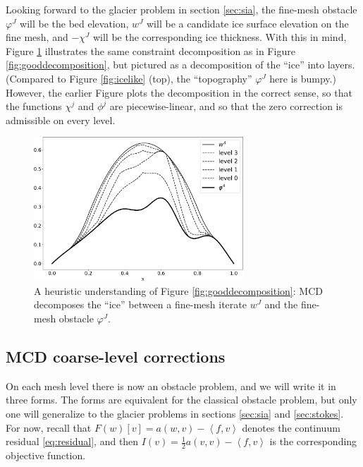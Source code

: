 \documentclass[letterpaper,final,12pt,reqno]{amsart}
\theoremstyle{claim}
\newcommand{\ip}[2]{\left<#1,#2\right>}
\numberwithin{equation}{section}
\numberwithin{figure}{section}
\numberwithin{table}{section}
\numberwithin{theorem}{section}
\begin{document}
Looking forward to the glacier problem in section \ref{sec:sia}, the fine-mesh obstacle $\varphi^J$ will be the bed elevation, $w^J$ will be a candidate ice surface elevation on the fine mesh, and $-\chi^J$ will be the corresponding ice thickness.  With this in mind, Figure \ref{fig:icelikedecomposition} illustrates the same constraint decomposition as in Figure \ref{fig:gooddecomposition}, but pictured as a decomposition of the ``ice'' into layers.  (Compared to Figure \ref{fig:icelike} (top), the ``topography'' $\varphi^J$ here is bumpy.)  However, the earlier Figure plots the decomposition in the correct sense, so that the functions $\chi^j$ and $\phi^j$ are piecewise-linear, and so that the zero correction is admissible on every level.

\begin{figure}
\includegraphics[width=0.7\textwidth]{fixfigs/icedec_defect.pdf}
\caption{A heuristic understanding of Figure \ref{fig:gooddecomposition}: MCD decomposes the ``ice'' between a fine-mesh iterate $w^J$ and the fine-mesh obstacle $\varphi^J$.}
\label{fig:icelikedecomposition}
\end{figure}

\subsection*{MCD coarse-level corrections}  On each mesh level there is now an obstacle problem, and we will write it in three forms.  The forms are equivalent for the classical obstacle problem, but only one will generalize to the glacier problems in sections \ref{sec:sia} and \ref{sec:stokes}.  For now, recall that $F(w)[v] = a(w,v) - \ip{f}{v}$ denotes the continuum residual \eqref{eq:residual}, and then $I(v) = \frac{1}{2} a(v,v) - \ip{f}{v}$ is the corresponding objective function.
\end{document}
